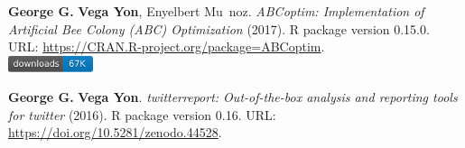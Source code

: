 \item \textbf{George G.} \textbf{Vega Yon}, Enyelbert Mu~noz. \textit{ABCoptim: Implementation of Artificial Bee Colony (ABC) Optimization} (2017). R package version 0.15.0. {\small URL}: \url{https://CRAN.R-project.org/package=ABCoptim}. \\\includegraphics[width=2.5cm]{fig/cran-downloads-abcoptim.pdf} 
\item \textbf{George G.} \textbf{Vega Yon}. \textit{{twitterreport: Out-of-the-box analysis and 
	reporting tools for twitter}} (2016). R package version 0.16. {\small URL}: \url{https://doi.org/10.5281/zenodo.44528}.  
